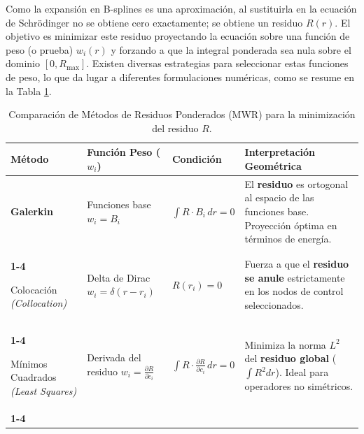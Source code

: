 \documentclass[12pt, a4paper, oneside, spanish]{book}
\begin{document}
Como la expansión en B-splines es una aproximación, al sustituirla en la ecuación de Schrödinger no se obtiene cero exactamente; se obtiene un residuo \( R(r) \). El objetivo es minimizar este residuo proyectando la ecuación sobre una función de peso (o prueba) \( w_i(r) \) y forzando a que la integral ponderada sea nula sobre el dominio \( [0,R_{\text{max}}] \). Existen diversas estrategias para seleccionar estas funciones de peso, lo que da lugar a diferentes formulaciones numéricas, como se resume en la Tabla \cref{tab:mwr-methods}.

\begin{table}[htbp]
    \centering
    \caption{Comparación de Métodos de Residuos Ponderados (MWR) para la minimización del residuo $R$.}
    \label{tab:mwr-methods}
    \renewcommand{\arraystretch}{2.0} %
    \setlength{\tabcolsep}{8pt}       %
    
    \begin{tabularx}{\textwidth}{ 
        >{\RaggedRight\bfseries}m{2.5cm}  
        >{\RaggedRight}m{3.5cm}           
        >{\centering}m{3.5cm}             
        >{\RaggedRight\arraybackslash}X   
    }
        \toprule
        Método & Función Peso ($w_i$) & Condición & Interpretación \newline Geométrica \\
        \midrule
        
        Galerkin & 
        Funciones base \newline $w_i = B_i$ & 
        $\displaystyle \int R \cdot B_i \, dr = 0$ & 
        El \textbf{residuo} es ortogonal al espacio de las funciones base. Proyección óptima en términos de energía. \\
        \cmidrule{1-4}
        
        Colocación \newline \textit{\footnotesize (Collocation)} & 
        Delta de Dirac \newline $w_i = \delta(r - r_i)$ & 
        $R(r_i) = 0$ & 
        Fuerza a que el \textbf{residuo se anule} estrictamente en los nodos de control seleccionados. \\
        \cmidrule{1-4}
        
        Mínimos Cuadrados \newline \textit{\footnotesize (Least \newline Squares)} & 
        Derivada del \newline residuo \newline $w_i = \frac{\partial R}{\partial c_i}$ & 
        $\displaystyle \int R \cdot \frac{\partial R}{\partial c_i} \, dr = 0$ & 
        Minimiza la norma $L^2$ del \textbf{residuo global} ($\int R^2 dr$). Ideal para operadores no simétricos. \\
        \cmidrule{1-4}
        

\end{tabularx}
\end{table}
\end{document}

